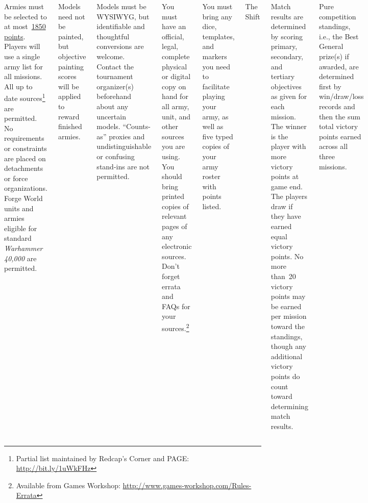\documentclass{40k}
\begin{document}

\begin{columns}


Armies must be selected to at most~\underline{1850 points}.  Players
will use a single army list for all missions.  All up to date
sources\footnote{Partial list maintained by Redcap's Corner and PAGE:
  \url{http://bit.ly/1uWkFHz}} are permitted.  No requirements or
constraints are placed on detachments or force organizations.  Forge
World units and armies eligible for standard \emph{Warhammer 40,000}
are permitted.

Models need not be painted, but objective painting scores will be
applied to reward finished armies.

Models must be WYSIWYG, but identifiable and thoughtful conversions
are welcome.  Contact the tournament organizer(s) beforehand about any
uncertain models.  ``Counts-as'' proxies and undistinguishable or
confusing stand-ins are not permitted.


You must have an official, legal, complete physical or digital copy on
hand for all army, unit, and other sources you are using.  You should
bring printed copies of relevant pages of any electronic sources.
Don't forget errata and FAQs for your sources.\footnote{Available from
  Games Workshop:
  \url{http://www.games-workshop.com/Rules-Errata}}

You must bring any dice, templates, and markers you need to facilitate
playing your army, as well as five typed copies of your army roster
with points listed.

\vfill
\begin{story}{62pt}{The Shift}

\end{story}

\columnbreak

%

Match results are determined by scoring primary, secondary, and
tertiary objectives as given for each mission.  The winner is the
player with more victory points at game end.  The players draw if they
have earned equal victory points.  No more than~20 victory points may
be earned per mission toward the standings, though any additional
victory points do count toward determining match results.

Pure competition standings, i.e., the Best General prize(s) if
awarded, are determined first by win/draw/loss records and then the
sum total victory points earned across all three missions.


\end{columns}
\end{document}
